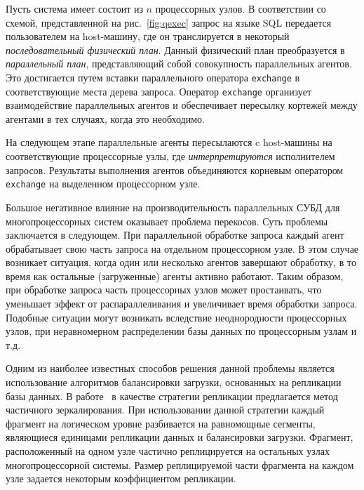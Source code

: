 \documentclass[11pt,oneside]{article}
\begin{document}
	\par Пусть система имеет состоит из $n$ процессорных узлов. В соответствии со схемой, представленной на рис.~\ref{fig:qexec} запрос на языке SQL передается пользователем на host-машину, где он транслируется в некоторый \textit{последовательный физический план}. Данный физический план преобразуется в \textit{параллельный план}, представляющий собой совокупность параллельных агентов. Это достигается путем вставки параллельного оператора \texttt{exchange} в соответствующие места дерева запроса. Оператор \texttt{exchange} организует взаимодействие параллельных агентов и обеспечивает пересылку кортежей между агентами в тех случаях, когда это необходимо.
	\par На следующем этапе параллельные агенты пересылаются c host-машины на соответствующие процессорные узлы, где \textit{интерпретируются} исполнителем запросов. Результаты выполнения агентов объединяются корневым оператором \texttt{exchange} на выделенном процессорном узле.
	\par Большое негативное влияние на производительность параллельных СУБД для многопроцессорных систем оказывает проблема перекосов. Суть проблемы заключается в следующем. При параллельной обработке запроса каждый агент обрабатывает свою часть запроса на отдельном процессорном узле. В этом случае возникает ситуация, когда один или несколько агентов завершают обработку, в то время как остальные (загруженные) агенты активно работают. Таким образом, при обработке запроса часть процессорных узлов может простаивать, что уменьшает эффект от распараллеливания и увеличивает время обработки запроса. Подобные ситуации могут возникать вследствие неоднородности процессорных узлов, при неравномерном распределении базы данных по процессорным узлам и т.д.
	\par Одним из наиболее известных способов решения данной проблемы является использование алгоритмов балансировки загрузки, основанных на репликации базы данных. В работе~\cite{B_Lepikhov2006} в качестве стратегии репликации предлагается метод частичного зеркалирования. При использовании данной стратегии каждый фрагмент на логическом уровне разбивается на равномощные сегменты, являющиеся единицами репликации данных и балансировки загрузки. Фрагмент, расположенный на одном узле частично реплицируется на остальных узлах многопроцессорной системы. Размер реплицируемой части фрагмента на каждом узле задается некоторым коэффициентом репликации. 
\end{document}
